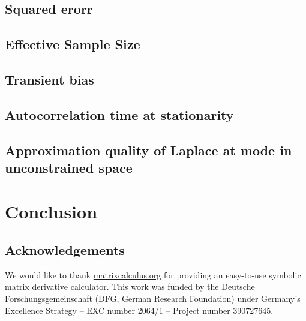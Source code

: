 \documentclass[11pt]{article}
\begin{document}
\subsection{Squared erorr}
\subsection{Effective Sample Size}
\subsection{Transient bias}
\subsection{Autocorrelation time at stationarity}
\subsection{Approximation quality of Laplace at mode in unconstrained  
space}

\section{Conclusion}
\subsection*{Acknowledgements}

We would like to thank \url{matrixcalculus.org} for providing an
easy-to-use symbolic matrix derivative calculator.
This work was funded by the Deutsche Forschungsgemeinschaft (DFG, German Research Foundation) under Germany’s Excellence Strategy – EXC number 2064/1 – Project number 390727645.


{}



\end{document}
